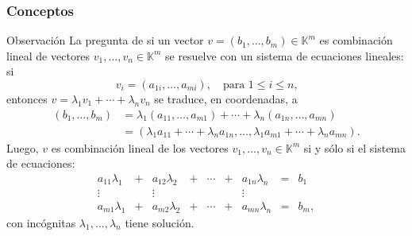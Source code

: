 \documentclass[a4paper,12pt]{article}
\begin{document}
\subsubsection{Conceptos}
\begin{obbox}{Observación}
    La pregunta de si un vector $v =(b_1,\ldots,b_m) \in \mathds{K}^m$ es combinación lineal de vectores $v_1,\ldots,v_n \in \mathds{K}^m$ se resuelve con un sistema de ecuaciones lineales: si 
    $$
    v_i = (a_{1i},\ldots,a_{mi}), \quad \text{para $1 \le i \le n$,}
    $$
    entonces $v = \lambda_1v_1 + \cdots +\lambda_nv_n$ se traduce, en coordenadas, a
    \begin{align*}
        (b_1,\ldots,b_m) &= \lambda_1(a_{11},\ldots,a_{m1}) + \cdots +\lambda_n(a_{1n},\ldots,a_{mn}) \\
        &= (\lambda_1a_{11} + \cdots+ \lambda_na_{1n}, \ldots, \lambda_1a_{m1} + \cdots+ \lambda_na_{mn}).
    \end{align*}
    Luego, $v$  es combinación lineal de los vectores $v_1,\ldots,v_n \in \mathds{K}^m$ si y sólo si  el sistema de ecuaciones:
    \begin{equation*}
    \begin{matrix}
    a_{11}\lambda_1& + &a_{12}\lambda_2& + &\cdots& + &a_{1n}\lambda_n &= &b_1\\
    \vdots&  &\vdots& &&  &\vdots \\
    a_{m1}\lambda_1& + &a_{m2}\lambda_2& + &\cdots& + &a_{mn}\lambda_n &=&b_m,
    \end{matrix}
    \end{equation*}
    \noindent con incógnitas $\lambda_1,\ldots, \lambda_n$ tiene solución.
\end{obbox}
\end{document}
